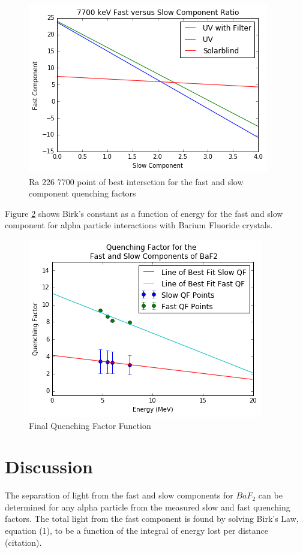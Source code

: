 \documentclass[aip, jmp, amsmath, amssymb, reprint, floatfix]{revtex4-1}
\begin{document}
\begin{figure}
  \centering
    \includegraphics[width=.8\columnwidth]{fourth.png}
  \caption{Ra 226 7700 point of best intersction for the fast and slow component quenching factors}
  \label{fig:fourth}
\end{figure}
 

\noindent
Figure \ref{fig:qf} shows Birk's constant as a function of energy for the fast and slow component for alpha particle interactions with Barium Fluoride crystals.

\begin{figure}
  \centering
    \includegraphics[width=.8\columnwidth]{qf.png}
  \caption{Final Quenching Factor Function}
  \label{fig:qf}
\end{figure} 


\section{\label{sec:level1}Discussion}


The separation of light from the fast and slow components for $BaF_2$ can be determined for any alpha particle from the measured slow and fast quenching factors. The total light from the fast component is found by solving Birk's Law, equation (1), to be a function of the integral of energy lost per distance (citation). 
\end{document}
